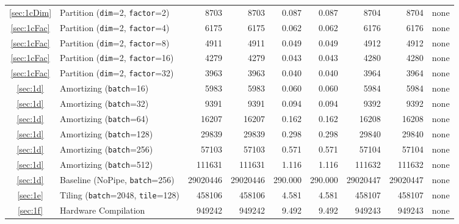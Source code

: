 {\begin{tabularx}{\textwidth}{cl*{6}{R}C}
\ref{sec:1cDim}    & Partition (\texttt{dim}=2, \texttt{factor}=2) & 8703 & 8703 & 0.087 & 0.087 & 8704 & 8704 & none \\
\ref{sec:1cFac}                     & Partition (\texttt{dim}=2, \texttt{factor}=4) & 6175 & 6175 & 0.062 & 0.062 & 6176 & 6176 & none \\
\ref{sec:1cFac}                     & Partition (\texttt{dim}=2, \texttt{factor}=8) & 4911 & 4911 & 0.049 & 0.049 & 4912 & 4912 & none \\
\ref{sec:1cFac}   & Partition (\texttt{dim}=2, \texttt{factor}=16) & 4279 & 4279 & 0.043 & 0.043 & 4280 & 4280 & none \\
\ref{sec:1cFac}                    & Partition (\texttt{dim}=2, \texttt{factor}=32) & 3963 & 3963 & 0.040 & 0.040 & 3964 & 3964 & none \\
\ref{sec:1d}                             & Amortizing (\texttt{batch}=16) & 5983 & 5983 & 0.060 & 0.060 & 5984 & 5984 & none \\
\ref{sec:1d}                             & Amortizing (\texttt{batch}=32) & 9391 & 9391 & 0.094 & 0.094 & 9392 & 9392 & none \\
\ref{sec:1d}                             & Amortizing (\texttt{batch}=64) & 16207 & 16207 & 0.162 & 0.162 & 16208 & 16208 & none \\
\ref{sec:1d}                            & Amortizing (\texttt{batch}=128) & 29839 & 29839 & 0.298 & 0.298 & 29840 & 29840 & none \\
\ref{sec:1d}           & Amortizing (\texttt{batch}=256) & 57103 & 57103 & 0.571 & 0.571 & 57104 & 57104 & none \\
\ref{sec:1d}                            & Amortizing (\texttt{batch}=512) & 111631 & 111631 & 1.116 & 1.116 & 111632 & 111632 & none \\
\ref{sec:1d}                              & Baseline (NoPipe, \texttt{batch}=256) & 29020446 & 29020446 & 290.000 & 290.000 & 29020447 & 29020447 & none \\
\ref{sec:1e}                                     & Tiling (\texttt{batch}=2048, \texttt{tile}=128) & 458106 & 458106 & 4.581 & 4.581 & 458107 & 458107 & none \\
\ref{sec:1f}                                & Hardware Compilation & 949242 & 949242 & 9.492 & 9.492 & 949243 & 949243 & none \\
    \bottomrule
\end{tabularx}

\begin{tabularx}{\textwidth}{cl*{5}{c}*{2}{C}}
    \toprule


\end{tabularx}}
